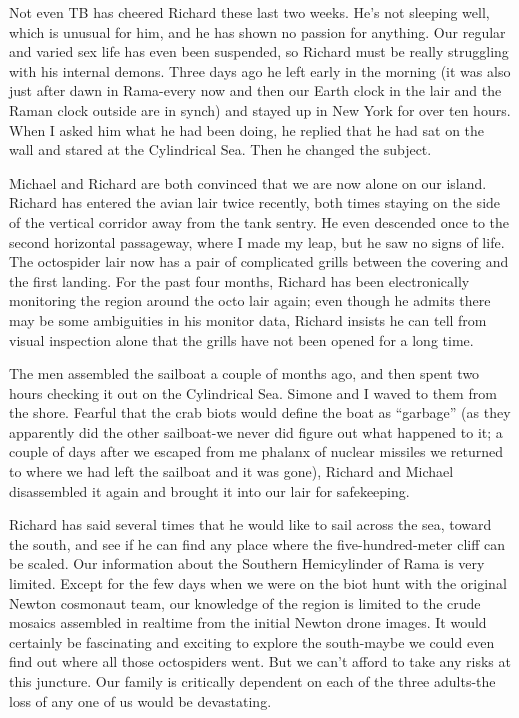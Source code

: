 \documentclass[]{article}
\begin{document}
Not even TB has cheered Richard these last two weeks.  He’s not sleeping well, which is unusual for him, and he has shown no passion for anything.  Our regular and varied sex life has even been suspended, so Richard must be really struggling with his internal demons.  Three days ago he left early in the morning (it was also just after dawn in Rama-every now and then our Earth clock in the lair and the Raman clock outside are in synch) and stayed up in New York for over ten hours.  When I asked him what he had been doing, he replied that he had sat on the wall and stared at the Cylindrical Sea.  Then he changed the subject.

Michael and Richard are both convinced that we are now alone on our island.  Richard has entered the avian lair twice recently, both times staying on the side of the vertical corridor away from the tank sentry.  He even descended once to the second horizontal passageway, where I made my leap, but he saw no signs of life.  The octospider lair now has a pair of complicated grills between the covering and the first landing.  For the past four months, Richard has been electronically monitoring the region around the octo lair again; even though he admits there may be some ambiguities in his monitor data, Richard insists he can tell from visual inspection alone that the grills have not been opened for a long time.

The men assembled the sailboat a couple of months ago, and then spent two hours checking it out on the Cylindrical Sea.  Simone and I waved to them from the shore.  Fearful that the crab biots would define the boat as “garbage” (as they apparently did the other sailboat-we never did figure out what happened to it; a couple of days after we escaped from me phalanx of nuclear missiles we returned to where we had left the sailboat and it was gone), Richard and Michael disassembled it again and brought it into our lair for safekeeping.

Richard has said several times that he would like to sail across the sea, toward the south, and see if he can find any place where the five-hundred-meter cliff can be scaled.  Our information about the Southern Hemicylinder of Rama is very limited.  Except for the few days when we were on the biot hunt with the original Newton cosmonaut team, our knowledge of the region is limited to the crude mosaics assembled in realtime from the initial Newton drone images.  It would certainly be fascinating and exciting to explore the south-maybe we could even find out where all those octospiders went.  But we can’t afford to take any risks at this juncture.  Our family is critically dependent on each of the three adults-the loss of any one of us would be devastating.
\end{document}
